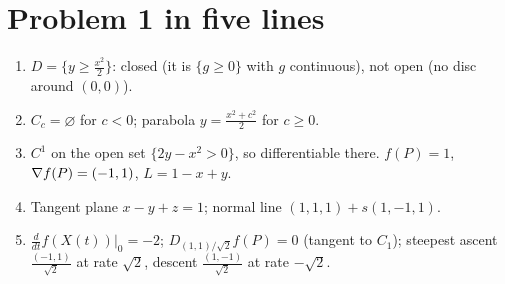 \section{Problem 1 in five lines}

\begin{remember}[unbreakable]
\begin{enumerate}
  \item $D=\{y\ge\frac{x^2}2\}$: closed (it is $\{g\ge0\}$ with $g$ continuous), not open (no disc around $(0,0)$).
  \item $C_c=\varnothing$ for $c<0$; parabola $y=\frac{x^2+c^2}2$ for $c\ge0$.
  \item $C^1$ on the open set $\{2y-x^2>0\}$, so differentiable there. $f(P)=1$, $\nabla f(P)=(-1,1)$, $L=1-x+y$.
  \item Tangent plane $x-y+z=1$; normal line $(1,1,1)+s(1,-1,1)$.
  \item $\frac{d}{dt}f(X(t))|_0=-2$; $D_{(1,1)/\sqrt2}f(P)=0$ (tangent to $C_1$); steepest ascent $\frac{(-1,1)}{\sqrt2}$ at rate $\sqrt2$, descent $\frac{(1,-1)}{\sqrt2}$ at rate $-\sqrt2$.
\end{enumerate}
\end{remember}

